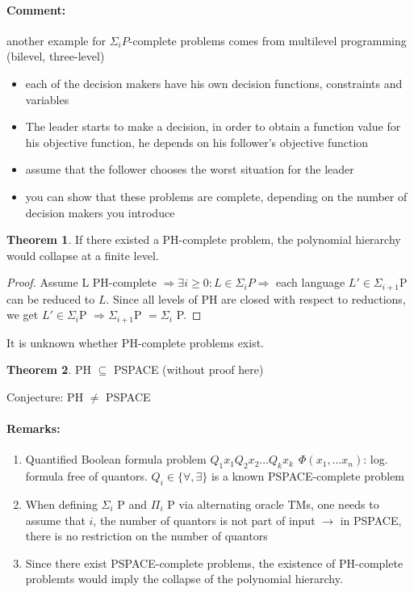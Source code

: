 \documentclass[11pt]{article}
\theoremstyle{definition}
\newtheorem{theorem}{Theorem}[section]
\theoremstyle{definition}
\begin{document}
\paragraph{Comment:} another example for $ \Sigma_i P$-complete problems comes from multilevel programming (bilevel, three-level)
\begin{itemize}
\item each of the decision makers have his own decision functions, constraints and variables
\item The leader starts to make a decision, in order to obtain a function value for his objective function, he depends on his follower's objective function
\item assume that the follower chooses the worst situation for the leader
\item you can show that these problems are complete, depending on the number of decision makers you introduce
\end{itemize}

\begin{theorem}
If there existed a PH-complete problem, the polynomial hierarchy would collapse at a finite level.
\end{theorem}

\begin{proof}
Assume L PH-complete $ \Rightarrow \exists i \geq 0: L \in \Sigma_i P \Rightarrow $ each language $ L' \in \Sigma_{i + 1}$P can be reduced to $ L $. Since all levels of PH are closed with respect to reductions, we get $ L' \in \Sigma_i $P $ \Rightarrow \Sigma_{i + 1} $P $ = \Sigma_i $ P.
\end{proof}

It is unknown whether PH-complete problems exist.

\begin{theorem}
PH $ \subseteq $ PSPACE (without proof here)
\end{theorem}

Conjecture: PH $ \neq $ PSPACE

\paragraph{Remarks:}
\begin{enumerate}
\item Quantified Boolean formula problem $ Q_1 x_1 Q_2 x_2 \dots Q_k x_k ~~ \Phi(x_1, \dots x_n) $: log. formula free of quantors. $ Q_i \in \{ \forall, \exists \} $ is a known PSPACE-complete problem
\item When defining $ \Sigma_i $ P and $ \Pi_i $ P via alternating oracle TMs, one needs to assume that $ i $, the number of quantors is not part of input $ \rightarrow $ in PSPACE, there is no restriction on the number of quantors
\item Since there exist PSPACE-complete problems, the existence of PH-complete problemts would imply the collapse of the polynomial hierarchy.
\end{enumerate}
\end{document}
